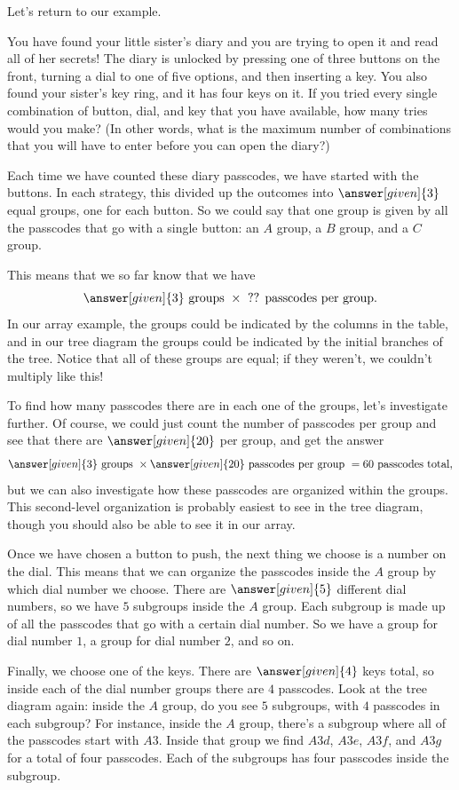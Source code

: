 \documentclass{ximera}
\begin{document}
Let's return to our example.
\begin{example}
You have found your little sister's diary and you are trying to open it and read all of her secrets! The diary is unlocked by pressing one of three buttons on the front, turning a dial to one of five options, and then inserting a key. You also found your sister's key ring, and it has four keys on it. If you tried every single combination of button, dial, and key that you have available, how many tries would you make? (In other words, what is the maximum number of combinations that you will have to enter before you can open the diary?)

Each time we have counted these diary passcodes, we have started with the buttons. In each strategy, this divided up the outcomes into $\answer[given]{3}$ equal groups, one for each button. So we could say that one group is given by all the passcodes that go with a single button: an $A$ group, a $B$ group, and a $C$ group.

This means that we so far know that we have
\[
\answer[given]{3} \textrm{ groups } \times \textrm{ ?? passcodes per group}.
\]
In our array example, the groups could be indicated by the columns in the table, and in our tree diagram the groups could be indicated by the initial branches of the tree. Notice that all of these groups are equal; if they weren't, we couldn't multiply like this!

To find how many passcodes there are in each one of the groups, let's investigate further. Of course, we could just count the number of passcodes per group and see that there are $\answer[given]{20}$ per group, and get the answer
\[
\answer[given]{3} \textrm{ groups } \times \answer[given]{20} \textrm{ passcodes per group } = 60 \textrm{ passcodes total},
\]
 but we can also investigate how these passcodes are organized within the groups. This second-level organization is probably easiest to see in the tree diagram, though you should also be able to see it in our array.
 
 Once we have chosen a button to push, the next thing we choose is a number on the dial. This means that we can organize the passcodes inside the $A$ group by which dial number we choose. There are $\answer[given]{5}$ different dial numbers, so we have $5$ subgroups inside the $A$ group. Each subgroup is made up of all the passcodes that go with a certain dial number. So we have a group for dial number $1$, a group for dial number $2$, and so on. 
 
 Finally, we choose one of the keys. There are $\answer[given]{4}$ keys total, so inside each of the dial number groups there are $4$ passcodes. Look at the tree diagram again: inside the $A$ group, do you see $5$ subgroups, with $4$ passcodes in each subgroup? For instance, inside the $A$ group, there's a subgroup where all of the passcodes start with $A3$. Inside that group we find $A3d$, $A3e$, $A3f$, and $A3g$ for a total of four passcodes. Each of the subgroups has four passcodes inside the subgroup.
 

\end{example}
\end{document}
